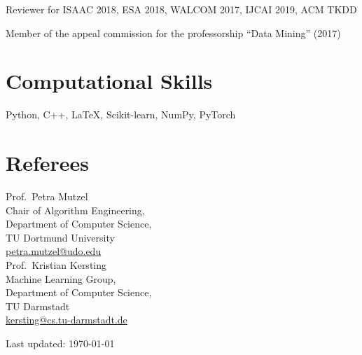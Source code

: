\documentclass[11pt, a4paper]{scrartcl}
\begin{document}
Reviewer for ISAAC 2018, ESA 2018, WALCOM 2017, IJCAI 2019, ACM TKDD

Member of the appeal commission for the professorship ``Data Mining'' (2017)

\section*{Computational Skills}
Python, C++, \LaTeX, Scikit-learn, NumPy, PyTorch

\section*{Referees}
Prof.~Petra Mutzel\\
Chair of Algorithm Engineering,\\ 
Department of Computer Science,\\
TU Dortmund University\\
\href{mailto:petra.mutzel@udo.edu}{petra.mutzel@udo.edu}\\


Prof.~Kristian Kersting\\ 
Machine Learning Group,\\
Department of Computer Science,\\
TU Darmstadt\\
\href{mailto:kersting@cs.tu-darmstadt.de}{kersting@cs.tu-darmstadt.de}\\

\vfill{} 
\begin{center}
{\scriptsize Last updated: \today}
\end{center}
\end{document}
